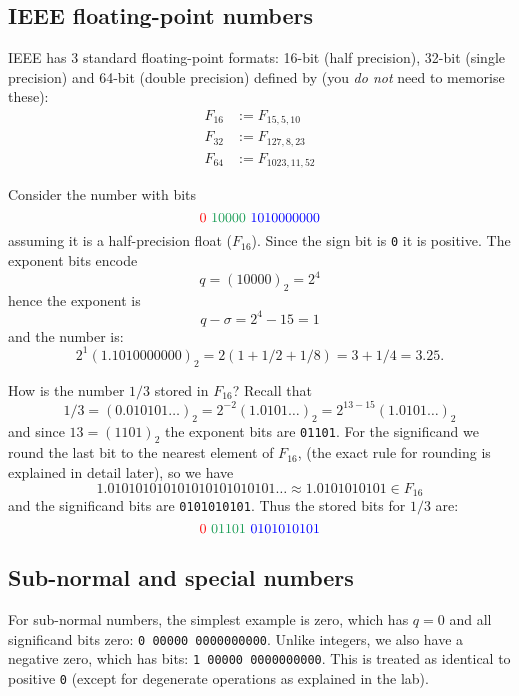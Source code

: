 \subsection{IEEE floating-point numbers}
\begin{definition}  IEEE has 3 standard floating-point formats: 16-bit (half precision), 32-bit (single precision) and 64-bit (double precision) defined by (you \emph{do not} need to memorise these):
\begin{align*}
F_{16} &:= F_{15,5,10} \\
F_{32} &:= F_{127,8,23} \\
F_{64} &:= F_{1023,11,52}
\end{align*}
\end{definition}

\begin{example} Consider the number with bits
\[
\red{0}\ \green{10000}\ \blue{1010000000}
\]
assuming it is a half-precision float ($F_{16}$).  Since the sign bit is \texttt{0} it is positive. The exponent bits encode 
\[
q = (10000)_2 = 2^4
\]
hence the exponent is
\[
q - \ensuremath{\sigma} = 2^4 - 15 = 1
\]
and the number is:
\[
2^1 (1.1010000000)_2 = 2 (1 + 1/2 + 1/8) = 3+1/4 = 3.25.
\]
\end{example}

\begin{example} How is the number $1/3$ stored in $F_{16}$? Recall that
\[
1/3 = (0.010101\ensuremath{\ldots})_2 = 2^{-2} (1.0101\ensuremath{\ldots})_2 = 2^{13-15} (1.0101\ensuremath{\ldots})_2
\]
and since $13 = (1101)_2$  the exponent bits are \texttt{01101}. For the significand we round the last bit to the nearest element of $F_{16}$,  (the exact rule for rounding is explained in detail later), so we have
\[
1.010101010101010101010101\ensuremath{\ldots}\approx 1.0101010101 \in F_{16} 
\]
and the significand bits are \texttt{0101010101}. Thus the stored bits for $1/3$ are:
\[
\red{0}\ \green{01101}\ \blue{0101010101}
\]
\end{example}

\subsection{Sub-normal and special numbers}
For sub-normal numbers, the simplest example is zero, which has $q=0$ and all significand bits zero: \texttt{0 00000 0000000000}. Unlike integers, we also have a negative zero, which has bits: \texttt{1 00000 0000000000}. This is treated as identical to positive \texttt{0} (except for degenerate operations as explained in the lab).


